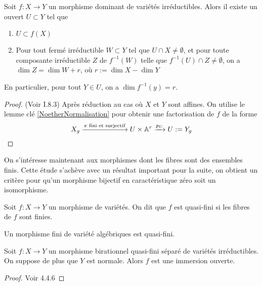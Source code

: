 \begin{thm}\label{dimensionfibres}
Soit $f:X\rightarrow Y$ un morphisme dominant de variétés irréductibles. Alors il existe un ouvert $U\subset Y$ tel que
\begin{enumerate}
\item $U\subset f(X)$
\item Pour tout fermé irréductible $W\subset Y$ tel que $U\cap X\neq \emptyset$, et pour toute composante irréductible $Z$ de $f^{-1}(W)$  telle que $f^{-1}(U)\cap Z\neq \emptyset$, on a $\dim Z=\dim W + r$, où $r:=\dim X -\dim Y$
\end{enumerate}
En particulier, pour tout $Y\in U$, on a $\dim f^{-1}(y)=r.$
\end{thm}
\begin{proof}
(Voir \cite{MumfordRedBook} I.8.3) Après réduction au cas où $X$ et $Y$ sont affines. On utilise le lemme clé \ref{NoetherNormalisation} pour obtenir une factorisation de $f$ de la forme 
$$X_g\xrightarrow{\pi \text{ fini et surjectif}}U\times \mathbb{A}^r \xrightarrow{p_U}U:=Y_g$$

\end{proof}

On s'intéresse maintenant aux morphismes dont les fibres sont des ensembles finis. Cette étude s'achève avec un résultat important pour la suite, on obtient un critère pour qu'un morphisme bijectif en caractéristique zéro soit un isomorphisme. 

\begin{defn}
Soit $f:X \rightarrow Y$ un morphisme de variétés. On dit que $f$ est quasi-fini si les fibres de $f$ sont finies.
\end{defn}

\begin{ex}
Un morphisme fini de variété algébriques est quasi-fini.
\end{ex}

\begin{thm}\label{ZMT}
Soit $f:X\rightarrow Y$ un morphisme birationnel quasi-fini séparé de variétés irréductibles. On suppose de plus que $Y$ est normale. Alors $f$ est une immersion ouverte.
\end{thm}
\begin{proof}
Voir \cite{QingLiu} 4.4.6
\end{proof}

